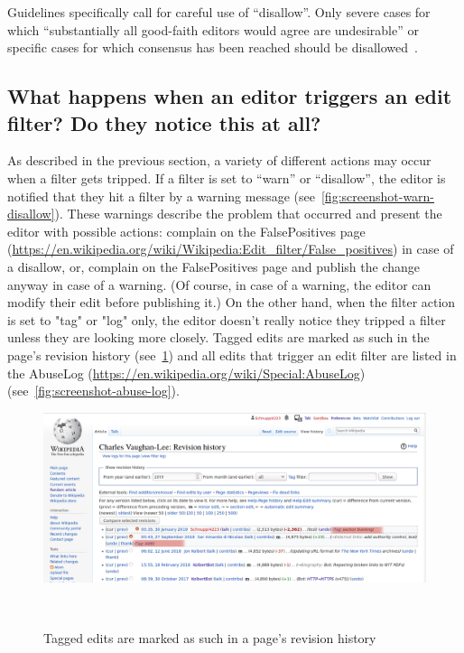 Guidelines specifically call for careful use of ``disallow''.
Only severe cases for which ``substantially all good-faith editors would agree are undesirable'' or specific cases for which consensus has been reached should be disallowed~\cite{Wikipedia:EditFilter}.

\subsection{What happens when an editor triggers an edit filter? Do they notice this at all?}

As described in the previous section, a variety of different actions may occur when a filter gets tripped.
If a filter is set to ``warn'' or ``disallow'', the editor is notified that they hit a filter by a warning message (see~\ref{fig:screenshot-warn-disallow}).
These warnings describe the problem that occurred and present the editor with possible actions:
complain on the FalsePositives page (\url{https://en.wikipedia.org/wiki/Wikipedia:Edit_filter/False_positives}) in case of a disallow,
or, complain on the FalsePositives page and publish the change anyway in case of a warning.
(Of course, in case of a warning, the editor can modify their edit before publishing it.)
On the other hand, when the filter action is set to "tag" or "log" only, the editor doesn't really notice they tripped a filter unless they are looking more closely.
Tagged edits are marked as such in the page's revision history (see~\ref{fig:tags-in-history})
and all edits that trigger an edit filter are listed in the AbuseLog (\url{https://en.wikipedia.org/wiki/Special:AbuseLog}) (see~\ref{fig:screenshot-abuse-log}).

\begin{figure}
\centering
  \includegraphics[width=0.9\columnwidth]{pics/screenshots-filter-trigger/Screenshot-tags-in-revision-history.png}
  \caption{Tagged edits are marked as such in a page's revision history}~\label{fig:tags-in-history}
\end{figure}

